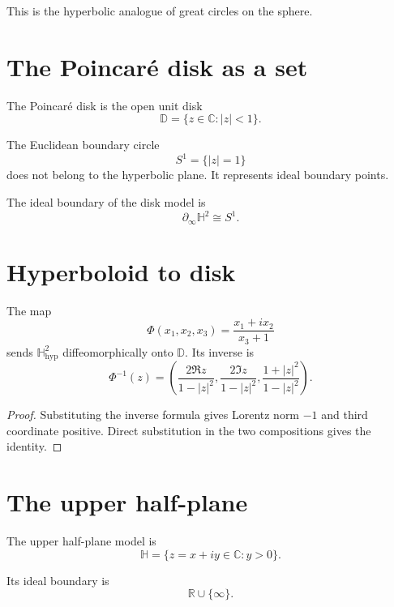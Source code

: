 This is the hyperbolic analogue of great circles on the sphere.

\section{The Poincaré disk as a set}

\begin{definition}\label{def:vii31-disk}
The Poincaré disk is the open unit disk
\[
\mathbb D
=
\{z\in\mathbb C:|z|<1\}.
\]
\end{definition}

The Euclidean boundary circle
\[
S^1=\{|z|=1\}
\]
does not belong to the hyperbolic plane.  It represents ideal boundary points.

\begin{definition}\label{def:vii31-ideal}
The ideal boundary of the disk model is
\[
\partial_\infty\mathbb H^2\cong S^1.
\]
\end{definition}

\section{Hyperboloid to disk}

\begin{theorem}\label{thm:vii31-hyp-disk-map}
The map
\[
\Phi(x_1,x_2,x_3)
=
\frac{x_1+ix_2}{x_3+1}
\]
sends \(\mathbb H^2_{\mathrm{hyp}}\) diffeomorphically onto \(\mathbb D\).
Its inverse is
\[
\Phi^{-1}(z)
=
\left(
\frac{2\Re z}{1-|z|^2},
\frac{2\Im z}{1-|z|^2},
\frac{1+|z|^2}{1-|z|^2}
\right).
\]
\end{theorem}

\begin{proof}
Substituting the inverse formula gives Lorentz norm \(-1\) and third coordinate
positive.  Direct substitution in the two compositions gives the identity.
\end{proof}

\section{The upper half-plane}

\begin{definition}\label{def:vii31-halfplane}
The upper half-plane model is
\[
\mathbb H
=
\{z=x+iy\in\mathbb C:y>0\}.
\]
\end{definition}

Its ideal boundary is
\[
\mathbb R\cup\{\infty\}.
\]

